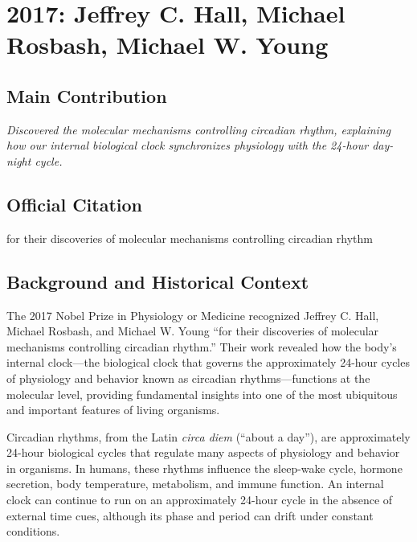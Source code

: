 \chapter[2017 --- Hall et al.]{2017: Jeffrey C. Hall, Michael Rosbash, Michael W. Young}
\label{ch:2017_Hall}

\section*{Main Contribution}

\textit{Discovered the molecular mechanisms controlling circadian rhythm, explaining how our internal biological clock synchronizes physiology with the 24-hour day-night cycle.}\cite{nobel-2017,lecture-2017}

\section{Official Citation}

for their discoveries of molecular mechanisms controlling circadian rhythm

\section{Background and Historical Context}

The 2017 Nobel Prize in Physiology or Medicine recognized Jeffrey C. Hall, Michael Rosbash, and Michael W. Young ``for their discoveries of molecular mechanisms controlling circadian rhythm.'' Their work revealed how the body's internal clock---the biological clock that governs the approximately 24-hour cycles of physiology and behavior known as circadian rhythms---functions at the molecular level, providing fundamental insights into one of the most ubiquitous and important features of living organisms.

Circadian rhythms, from the Latin \textit{circa diem} (``about a day''), are approximately 24-hour biological cycles that regulate many aspects of physiology and behavior in organisms. In humans, these rhythms influence the sleep-wake cycle, hormone secretion, body temperature, metabolism, and immune function. An internal clock can continue to run on an approximately 24-hour cycle in the absence of external time cues, although its phase and period can drift under constant conditions.

